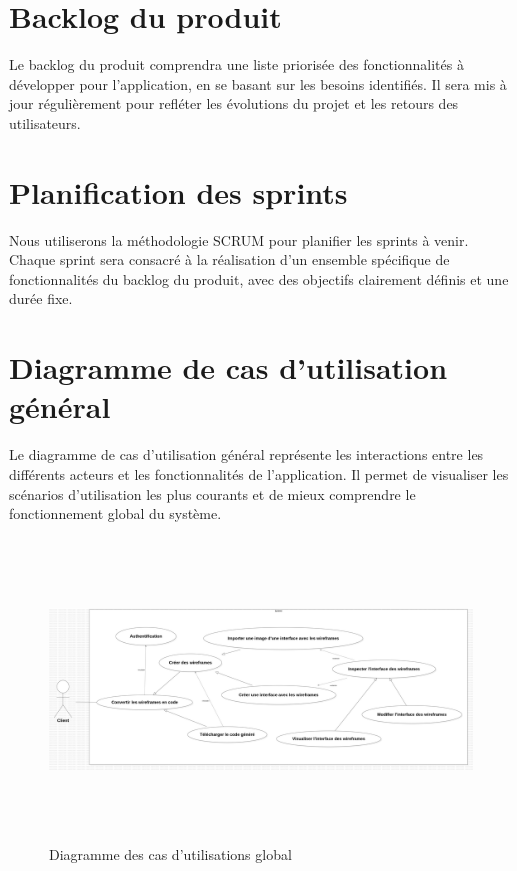\section{Backlog du produit}

Le backlog du produit comprendra une liste priorisée des fonctionnalités à développer pour l'application, en se basant sur les besoins identifiés. Il sera mis à jour régulièrement pour refléter les évolutions du projet et les retours des utilisateurs.

\section{Planification des sprints}

Nous utiliserons la méthodologie SCRUM pour planifier les sprints à venir. Chaque sprint sera consacré à la réalisation d'un ensemble spécifique de fonctionnalités du backlog du produit, avec des objectifs clairement définis et une durée fixe.

\section{Diagramme de cas d'utilisation général}

Le diagramme de cas d'utilisation général représente les interactions entre les différents acteurs et les fonctionnalités de l'application. Il permet de visualiser les scénarios d'utilisation les plus courants et de mieux comprendre le fonctionnement global du système.

\begin{figure}[H]
    \centering
    \includegraphics[width=1\linewidth,height=8cm]{images/UseCaseDiagram1.png}
    \caption{Diagramme des cas d'utilisations global}
    \label{fig:diagramme_cas_utilisation}
\end{figure}

